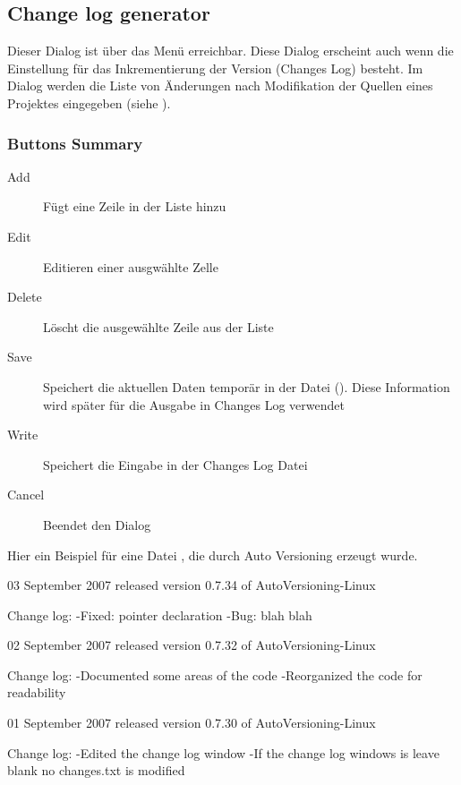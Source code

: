 \subsection{Change log generator}

Dieser Dialog ist über das Menü  erreichbar. Diese Dialog erscheint auch wenn die Einstellung  für das Inkrementierung der Version (Changes Log) besteht. Im Dialog werden die Liste von Änderungen nach Modifikation der Quellen eines Projektes eingegeben (siehe ).


\subsubsection{Buttons Summary}

\begin{description}
\item[Add] Fügt eine Zeile in der Liste hinzu
\item[Edit] Editieren einer ausgwählte Zelle
\item[Delete] Löscht die ausgewählte Zeile aus der Liste
\item[Save] Speichert die aktuellen Daten temporär in der Datei (). Diese Information wird später für die Ausgabe in Changes Log verwendet
\item[Write] Speichert die Eingabe in der Changes Log Datei
\item[Cancel] Beendet den Dialog
\end{description}

Hier ein Beispiel für eine Datei , die durch Auto Versioning erzeugt wurde.

\begin{code}
03 September 2007
   released version 0.7.34 of AutoVersioning-Linux

     Change log:
        -Fixed: pointer declaration
        -Bug: blah blah

02 September 2007
   released version 0.7.32 of AutoVersioning-Linux

     Change log:
        -Documented some areas of the code
        -Reorganized the code for readability

01 September 2007
   released version 0.7.30 of AutoVersioning-Linux

     Change log:
        -Edited the change log window
        -If the change log windows is leave blank no changes.txt is modified
\end{code}
